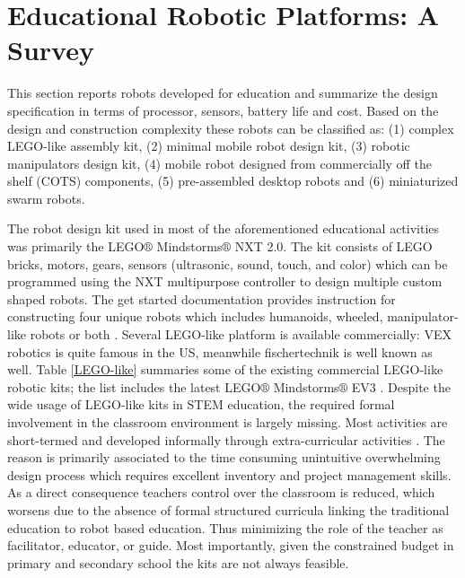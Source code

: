 \documentclass[conference]{IEEEtran}
\begin{document}
\section{Educational Robotic Platforms: A Survey}
This section reports robots developed for education and summarize the design specification in terms 
of processor, sensors, battery life and cost. Based on the design and construction complexity these robots can be 
classified as: (1) complex LEGO-like assembly kit, (2) minimal mobile robot design kit, (3) robotic manipulators 
design kit, (4) mobile robot designed from commercially off the shelf (COTS) components, (5) pre-assembled desktop 
robots and (6) miniaturized swarm robots.

The robot design kit used in most of the aforementioned educational activities was primarily the LEGO$\circledR$ 
Mindstorms$\circledR$ NXT 2.0. The kit consists of LEGO bricks, motors, gears, sensors (ultrasonic, sound, touch, and 
color) which can be programmed using the NXT multipurpose controller to design multiple custom shaped robots. The get 
started documentation provides instruction for constructing four unique robots which includes humanoids, wheeled, 
manipulator-like robots or both \cite{LEGONXT}. Several LEGO-like platform is available commercially: VEX robotics is 
quite famous in the US, meanwhile fischertechnik is well known as well. Table \ref{LEGO-like} summaries some of the 
existing commercial LEGO-like robotic kits; the list includes the latest LEGO$\circledR$ Mindstorms$\circledR$ EV3 
\cite{LEGOEV3}. Despite the wide usage of LEGO-like kits in STEM education, the required formal involvement in the 
classroom environment is largely missing. Most activities are short-termed and developed informally through 
extra-curricular activities \cite{mubin2013review}. The reason is primarily associated to the time consuming unintuitive 
overwhelming design process which requires excellent inventory and project management skills. As a direct consequence 
teachers control over the classroom is reduced, which worsens due to the absence of formal structured curricula linking 
the traditional education to robot based education. Thus minimizing the role of the teacher as facilitator, educator, 
or guide. Most importantly, given the constrained budget in primary and secondary school the kits are not always 
feasible. 
\end{document}
